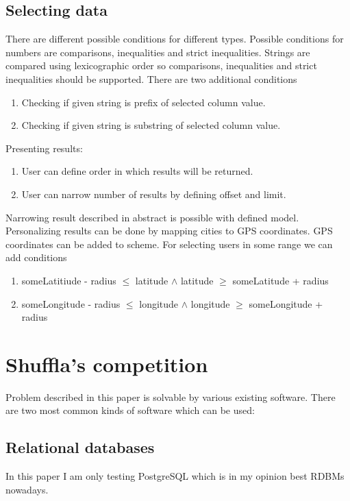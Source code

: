 \documentclass[10pt,a4paper]{article}
\begin{document}
\subsection{Selecting data}
There are different possible conditions for different types. Possible conditions for numbers are comparisons, inequalities and strict inequalities. Strings are compared using lexicographic order so comparisons, inequalities and strict inequalities should be supported. There are two additional conditions
\begin{enumerate}
\item Checking if given string is prefix of selected column value. 
\item Checking if given string is substring of selected column value. 
\end{enumerate}
Presenting results:
\begin{enumerate}
\item User can define order in which results will be returned.
\item User can narrow number of results by defining offset and limit.
\end{enumerate}

Narrowing result described in abstract is possible with defined model. Personalizing results can be done by mapping cities to GPS coordinates. GPS coordinates can be added to scheme. For selecting users in some range we can add conditions   
\begin{enumerate}
\item{someLatitiude - radius $\leq$ latitude $\wedge$ latitude $\geq$ someLatitude + radius}
\item{someLongitude - radius $\leq$ longitude $\wedge$ longitude $\geq$ someLongitude + radius}
\end{enumerate}

\section{Shuffla's competition}
Problem described in this paper is solvable by various existing software. There are two most common kinds of software which can be used:

\subsection{Relational databases}
In this paper I am only testing PostgreSQL which is in my opinion best RDBMs nowadays.
\end{document}
